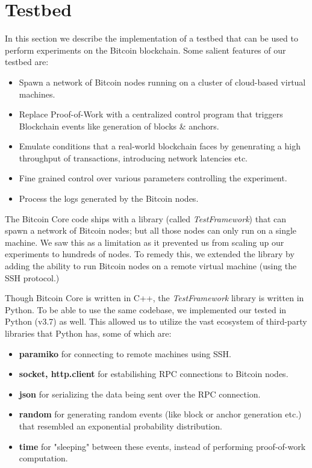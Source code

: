 

\newpage
\section{Testbed} \label{impl-testbed}

In this section we describe the implementation of a testbed that can be used to perform experiments on the Bitcoin blockchain. Some salient features of our testbed are:

\begin{itemize}
    \item Spawn a network of Bitcoin nodes running on a cluster of cloud-based virtual machines.
    \item Replace Proof-of-Work with a centralized control program that triggers Blockchain events like generation of blocks \& anchors.
    \item Emulate conditions that a real-world blockchain faces by genenrating a high throughput of transactions, introducing network latencies etc.
    \item Fine grained control over various parameters controlling the experiment.
    \item Process the logs generated by the Bitcoin nodes.
\end{itemize}

The Bitcoin Core code ships with a library (called \textit{TestFramework}) that can spawn a network of Bitcoin nodes; but all those nodes can only run on a single machine. We saw this as a limitation as it prevented us from scaling up our experiments to hundreds of nodes. 
To remedy this, we extended the library by adding the ability to run Bitcoin nodes on a remote virtual machine (using the SSH protocol.)

Though Bitcoin Core is written in C++, the \textit{TestFramework} library is written in Python. To be able to use the same codebase, we implemented our tested in Python (v3.7) as well. 
This allowed us to utilize the vast ecosystem of third-party libraries that Python has, some of which are: 

\begin{itemize}
    \item \textbf{paramiko} for connecting to remote machines using SSH.
    \item \textbf{socket, http.client} for estabilishing RPC connections to Bitcoin nodes.
    \item \textbf{json} for serializing the data being sent over the RPC connection.
    \item \textbf{random} for generating random events (like block or anchor generation etc.) that resembled an exponential probability distribution.
    \item \textbf{time} for "sleeping" between these events, instead of performing proof-of-work computation. 
\end{itemize}

